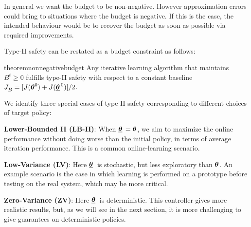 \begin{note}
In general we want the budget to be non-negative. However approximation errors could bring to situations where the budget is negative. If this is the case, the intended behaviour would be to recover the budget as soon as possible via required improvements.
\end{note}

Type-II safety can be restated as a budget constraint as follows:
\begin{restatable}{theorem}{nonnegativebudget}\label{th:nonnegativebudget}
Any iterative learning algorithm that maintains $B^t \geq 0$ fulfills type-II safety with respect to a constant baseline $\jbase[] = [J(\vtheta^0) + J(\vtarget[0])] / 2$.
\end{restatable}
%
We identify three special cases of type-II safety corresponding to different choices of target policy:

\textbf{Lower-Bounded II (LB-II)}: When $\vtarget[]=\vtheta$, we aim to maximize the online performance without doing worse than the initial policy, in terms of average iteration performance. This is a common online-learning scenario.

\textbf{Low-Variance (LV)}:  Here $\vtarget[]$ is stochastic, but less exploratory than $\vtheta$. An example scenario is the case in which learning is performed on a prototype before testing on the real system, which may be more critical. 

\textbf{Zero-Variance (ZV)}: Here $\vtarget[]$ is deterministic. This controller gives more realistic results, but, as we will see in the next section, it is more challenging to give guarantees on deterministic policies.  

